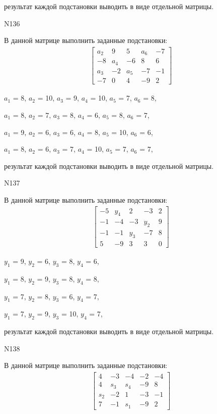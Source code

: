 \documentclass[11pt]{report}
\begin{document}
результат каждой подстановки выводить в виде отдельной матрицы.

N136

В данной матрице выполнить заданные подстановки:
\begin{align*}
\left[\begin{matrix}a_{2} & 9 & 5 & a_{6} & -7\\-8 & a_{4} & -6 & 8 & 6\\a_{3} & -2 & a_{5} & -7 & -1\\-7 & 0 & 4 & -9 & 2\end{matrix}\right]
\end{align*}


$a_{1}$ = 8, $a_{2}$ = 10, $a_{3}$ = 9, $a_{4}$ = 10, $a_{5}$ = 7, $a_{6}$ = 8, 

$a_{1}$ = 8, $a_{2}$ = 7, $a_{3}$ = 8, $a_{4}$ = 6, $a_{5}$ = 8, $a_{6}$ = 7, 

$a_{1}$ = 9, $a_{2}$ = 6, $a_{3}$ = 6, $a_{4}$ = 8, $a_{5}$ = 10, $a_{6}$ = 6, 

$a_{1}$ = 8, $a_{2}$ = 6, $a_{3}$ = 7, $a_{4}$ = 10, $a_{5}$ = 7, $a_{6}$ = 7, 

результат каждой подстановки выводить в виде отдельной матрицы.

N137

В данной матрице выполнить заданные подстановки:
\begin{align*}
\left[\begin{matrix}-5 & y_{4} & 2 & -3 & 2\\-1 & -4 & -3 & y_{2} & 9\\-1 & -1 & y_{3} & -7 & 8\\5 & -9 & 3 & 3 & 0\end{matrix}\right]
\end{align*}


$y_{1}$ = 9, $y_{2}$ = 6, $y_{3}$ = 8, $y_{4}$ = 6, 

$y_{1}$ = 8, $y_{2}$ = 9, $y_{3}$ = 8, $y_{4}$ = 8, 

$y_{1}$ = 7, $y_{2}$ = 8, $y_{3}$ = 6, $y_{4}$ = 7, 

$y_{1}$ = 7, $y_{2}$ = 9, $y_{3}$ = 10, $y_{4}$ = 7, 

результат каждой подстановки выводить в виде отдельной матрицы.

N138

В данной матрице выполнить заданные подстановки:
\begin{align*}
\left[\begin{matrix}4 & -3 & -4 & -2 & -4\\4 & s_{3} & s_{4} & -9 & 8\\s_{2} & -2 & 1 & -3 & -1\\7 & -1 & s_{1} & -9 & 2\end{matrix}\right]
\end{align*}
\end{document}
